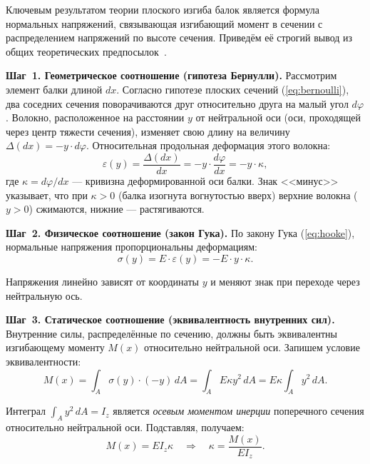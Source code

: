 Ключевым результатом теории плоского изгиба балок является формула нормальных напряжений, связывающая изгибающий момент в сечении с распределением напряжений по высоте сечения. Приведём её строгий вывод из общих теоретических предпосылок~\cite{feodosev, timoshenko, gere2018}.

\textbf{Шаг~1. Геометрическое соотношение (гипотеза Бернулли).} Рассмотрим элемент балки длиной $dx$. Согласно гипотезе плоских сечений (\ref{eq:bernoulli}), два соседних сечения поворачиваются друг относительно друга на малый угол $d\varphi$. Волокно, расположенное на расстоянии $y$ от нейтральной оси (оси, проходящей через центр тяжести сечения), изменяет свою длину на величину $\Delta(dx) = -y \cdot d\varphi$. Относительная продольная деформация этого волокна:
\begin{equation}
  \varepsilon(y) = \frac{\Delta(dx)}{dx} = -y \cdot \frac{d\varphi}{dx} = -y \cdot \kappa,
  \label{eq:strain_bending}
\end{equation}
где $\kappa = d\varphi / dx$ --- кривизна деформированной оси балки. Знак <<минус>> указывает, что при $\kappa > 0$ (балка изогнута вогнутостью вверх) верхние волокна ($y > 0$) сжимаются, нижние --- растягиваются.

\textbf{Шаг~2. Физическое соотношение (закон Гука).} По закону Гука (\ref{eq:hooke}), нормальные напряжения пропорциональны деформациям:
\begin{equation}
  \sigma(y) = E \cdot \varepsilon(y) = -E \cdot y \cdot \kappa.
  \label{eq:stress_kappa}
\end{equation}

Напряжения линейно зависят от координаты $y$ и меняют знак при переходе через нейтральную ось.

\textbf{Шаг~3. Статическое соотношение (эквивалентность внутренних сил).} Внутренние силы, распределённые по сечению, должны быть эквивалентны изгибающему моменту $M(x)$ относительно нейтральной оси. Запишем условие эквивалентности:
\begin{equation}
  M(x) = \int_{A} \sigma(y) \cdot (-y) \, dA = \int_{A} E \kappa y^2 \, dA = E \kappa \int_{A} y^2 \, dA.
  \label{eq:moment_integral}
\end{equation}

Интеграл $\int_A y^2 \, dA = I_z$ является \textit{осевым моментом инерции} поперечного сечения относительно нейтральной оси. Подставляя, получаем:
\begin{equation}
  M(x) = E I_z \kappa \quad\Rightarrow\quad \kappa = \frac{M(x)}{E I_z}.
  \label{eq:kappa_M}
\end{equation}

